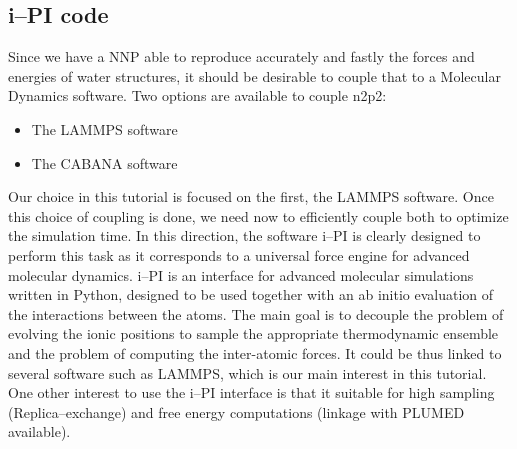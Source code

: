 \documentclass[12pt]{article}
\begin{document}
\subsection{i--PI code}
Since we have a NNP able to reproduce accurately and fastly the forces and energies of water structures, it should be desirable to couple that to a Molecular Dynamics software. Two options are available to couple n2p2:
\begin{itemize}
    \item The LAMMPS software
    \item The CABANA software
\end{itemize}
Our choice in this tutorial is focused on the first, the LAMMPS software. Once this choice of coupling is done, we need now to efficiently couple both to optimize the simulation time. In this direction, the software i--PI is clearly designed to perform this task as it corresponds to a universal force engine for advanced molecular dynamics. i--PI is an interface for advanced molecular simulations written in Python, designed to be used together with an ab initio evaluation of the interactions between the atoms. The main goal is to decouple the problem of evolving the ionic positions to sample the appropriate thermodynamic ensemble and the problem of computing the inter-atomic forces. It could be thus linked to several software such as LAMMPS, which is our main interest in this tutorial. One other interest to use the i--PI interface is that it suitable for high sampling (Replica--exchange) and free energy computations (linkage with PLUMED available).
%
\end{document}
